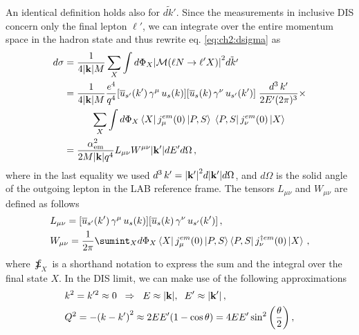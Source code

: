 An identical definition holds also for $\widetilde{d k'}$.  Since the measurements in inclusive DIS concern only the final lepton $\ell'$, we can integrate over the entire momentum space in the hadron state and thus rewrite eq. \eqref{eq:ch2:dsigma} as
\begin{equation}
    \begin{split}
        d\sigma &= \frac{1}{4 \qty|\vb{k}| M} \sum_{X} \int d\Phi_X \qty| \mathcal{M} \qty( \ell N \rightarrow \ell'X ) |^2 \tilde{d k'}  \\
        & = \frac{1}{4 \qty|\vb{k}| M}  \frac{e^4}{q^4} \qty[ \overline{u}_{s'}(k') \, \gamma^{\mu}\, u_s(k)] \qty[\overline{u}_{s}(k) \,\gamma^{\nu}\, u_{s'}(k') ] \; \frac{d^3 \, k'}{2 E' (2\pi)^3} \times \\
        & \hspace{10mm} \sum_{X} \int d\Phi_X  \bra{X} j_{\mu}^{em} \qty(0) \ket{P,S} \; \bra{P,S} j_{\nu}^{em} \qty(0) \ket{X}  \\
        & = \frac{\alpha_{\textrm{em}}^2}{2 M \qty|\vb{k}| q^4} L_{\mu\nu} W^{\mu\nu} \qty|\vb{k}'| dE' d\Omega \,,
        \label{eq:ch2:dsigma2}
    \end{split}
\end{equation}
where in the last equality we used $d^3 \, k' = \qty| \vb{k}' |^2 d|\vb{k}'| d\Omega$, and $d\Omega$ is the solid angle of the outgoing lepton in the LAB reference frame. The tensors $L_{\mu\nu}$ and $W_{\mu\nu}$ are defined as follows
\begin{align}
    &L_{\mu\nu} = \qty[ \overline{u}_{s'}(k') \, \gamma^{\mu}\, u_s(k)] \qty[\overline{u}_{s}(k) \,\gamma^{\nu}\, u_{s'}(k') ] \,,
    \label{eq:ch2:lep_tens} \\
    &W_{\mu\nu} = \frac{1}{2\pi} \sumint_{X}  d\Phi_X  \bra{X} j_{\mu}^{em} (0) \ket{P,S}  \bra{P,S} j_{\nu}^{\dag em} (0) \ket{X}  \,,
    \label{eq:ch2:had_tens}
\end{align}
where $\sumint_{X}$ is a shorthand notation to express the sum and the integral over the final state $X$. In the DIS limit, we can make use of the following approximations
\begin{align}
    &k^2 = k'^2 \approx 0 \hspace{2mm} \Rightarrow \hspace{2mm} E \approx \qty| \vb{k} |, \hspace{2mm} E' \approx \qty| \vb{k'}|  \,,
    \label{eq:ch2:lep_approx}\\
    &Q^2 = - \qty(k - k')^2 \approx  2EE' \qty(1 - \cos \theta) = 4EE' \sin^2 \qty(\frac{\theta}{2}) \,,
    \label{eq:ch2:Q2_approx}
\end{align}
